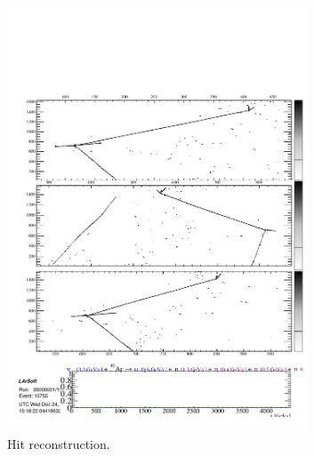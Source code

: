 \begin{figure}
  \centering
  \begin{subfigure}[t]{0.48\linewidth}
    \centering
    \includegraphics[width=0.98\textwidth]{2DnumuCCHits.pdf}
    \caption{Hit reconstruction.}
    \label{fig:2DnumuCCHits}
  \end{subfigure}
  \hfill
  \begin{subfigure}[t]{0.48\linewidth}
    \centering

\end{subfigure}
\end{figure}
